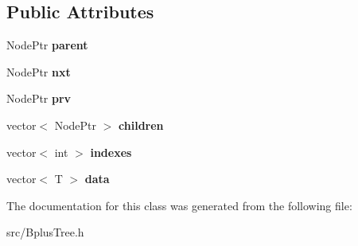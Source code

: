 \subsection*{Public Attributes}
\begin{DoxyCompactItemize}
\item 
\mbox{\label{classBplusTree_1_1BplusNode_a9f4cabef276864d922352ea921581edb}} 
Node\+Ptr {\bfseries parent}
\item 
\mbox{\label{classBplusTree_1_1BplusNode_afd53466ca4f36766ba3c0ba96a6f7c6c}} 
Node\+Ptr {\bfseries nxt}
\item 
\mbox{\label{classBplusTree_1_1BplusNode_ae17e7b3bc8fa2fe184dcc564f1569b65}} 
Node\+Ptr {\bfseries prv}
\item 
\mbox{\label{classBplusTree_1_1BplusNode_ae602b66322e25fd68b3b75745a2a17f1}} 
vector$<$ Node\+Ptr $>$ {\bfseries children}
\item 
\mbox{\label{classBplusTree_1_1BplusNode_a6b60fb47981a9aafcad811aa12502e28}} 
vector$<$ int $>$ {\bfseries indexes}
\item 
\mbox{\label{classBplusTree_1_1BplusNode_a889068a8a0daa157e7beed089b259df7}} 
vector$<$ T $>$ {\bfseries data}
\end{DoxyCompactItemize}


The documentation for this class was generated from the following file\+:\begin{DoxyCompactItemize}
\item 
src/Bplus\+Tree.\+h\end{DoxyCompactItemize}
